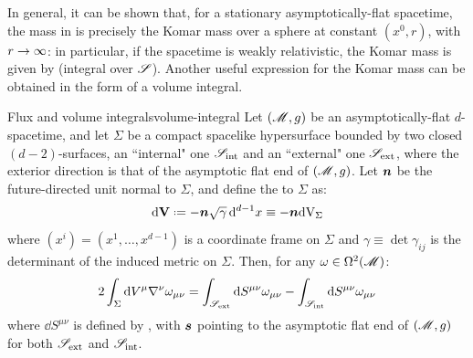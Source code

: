 In general, it can be shown that, for a stationary asymptotically-flat spacetime, the mass in  is precisely the Komar mass over a sphere at constant $ (x^0 , r) $, with $ r \rightarrow \infty $: in particular, if the spacetime is weakly relativistic, the Komar mass is given by  (integral over $ \mathscr{S} $).
Another useful expression for the Komar mass can be obtained in the form of a volume integral.

\begin{lemma}{Flux and volume integrals}{volume-integral}
  Let $ (\mathscr{M} , g) $ be an asymptotically-flat $ d $-spacetime, and let $ \Sigma $ be a compact spacelike hypersurface bounded by two closed $ (d-2) $-surfaces, an ``internal" one $ \mathscr{S}_\text{int} $ and an ``external" one $ \mathscr{S}_\text{ext} $, where the exterior direction is that of the asymptotic flat end of $ (\mathscr{M} , g) $. Let $ \boldsymbol{n} $ be the future-directed unit normal to $ \Sigma $, and define the  to $ \Sigma $ as:
  \begin{equation}
    \dd \ve{V} \defeq - \nb \sqrt{\gamma} \, \dd^{d-1} x \equiv - \nb \volf_\Sigma
  \end{equation}
  where $ (x^i) = (x^1 , \dots , x^{d-1}) $ is a coordinate frame on $ \Sigma $ and $ \gamma \equiv \det \gamma_{ij} $ is the determinant of the induced metric on $ \Sigma $. Then, for any $ \omega \in \Omega^{2}(\mathscr{M}) $:
  \begin{equation}
    2 \int_\Sigma \mathrm{d} V^\mu \nabla^\nu \omega_{\mu \nu} = \int_{\mathscr{S}_\text{ext}} \mathrm{d} S^{\mu \nu} \omega_{\mu \nu} - \int_{\mathscr{S}_\text{int}} \mathrm{d} S^{\mu \nu} \omega_{\mu \nu}
  \end{equation}
  where $ \dd S^{\mu \nu} $ is defined by , with $ \boldsymbol{s} $ pointing to the asymptotic flat end of $ (\mathscr{M} , g) $ for both $ \mathscr{S}_\text{ext} $ and $ \mathscr{S}_\text{int} $.
\end{lemma}

